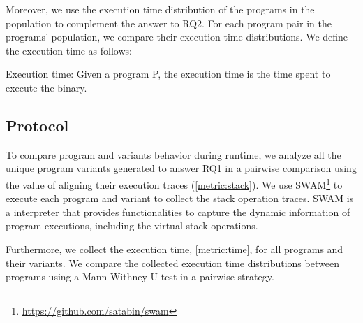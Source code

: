 Moreover, we use the execution time distribution of the programs in the population to complement the answer to RQ2. For each program pair in the programs' population, we compare their execution time distributions. We define the execution time as follows:

\begin{metric}{Execution time:}\label{metric:time}
    \normalfont 
	Given a \wasm program P, the execution time is the time spent to execute the binary.
\end{metric}




\subsection*{Protocol}

To compare program and variants behavior during runtime, we analyze all the unique program variants generated to answer RQ1 in a pairwise comparison using the value of aligning their execution traces (\autoref{metric:stack}). We use SWAM\footnote{\url{https://github.com/satabin/swam}} to execute each program and variant to collect the stack operation traces. SWAM is a \wasm interpreter that provides functionalities to capture the dynamic information of \wasm program executions, including the virtual stack operations.

Furthermore, we collect the execution time, \autoref{metric:time}, for all programs and their variants. We compare the collected execution time distributions between programs using a Mann-Withney U test \cite{mann1947} in a pairwise strategy.


 